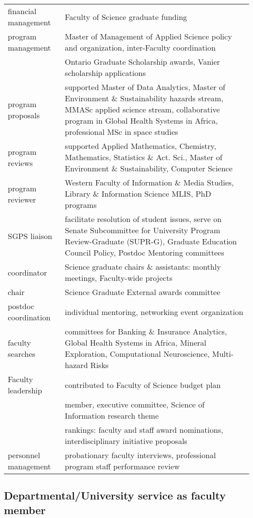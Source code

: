 \begin{tabularx}{\textwidth}{lX}
financial management & Faculty of Science graduate funding  \\
program management & Master of Management of Applied Science policy and organization, inter-Faculty coordination   \\
  & Ontario Graduate Scholarship awards, Vanier scholarship applications \\
program proposals &  supported Master of Data Analytics, Master of Environment \& Sustainability hazards stream, MMASc applied science stream, collaborative program in Global Health Systems in Africa, professional MSc in space studies  \\
program reviews & supported Applied Mathematics, Chemistry, Mathematics, Statistics \& Act. Sci., Master of Environment \& Sustainability, Computer Science  \\
program reviewer & Western Faculty of Information \& Media Studies, Library \& Information Science MLIS, PhD programs  \\
SGPS liaison  &  facilitate resolution of student issues, serve on Senate Subcommittee for University Program Review-Graduate (SUPR-G), Graduate Education Council Policy, Postdoc Mentoring committees  \\
coordinator & Science graduate chairs \& assistants: monthly meetings, Faculty-wide projects \\
chair & Science Graduate External awards committee  \\
postdoc coordination & individual mentoring, networking event organization  \\ 
faculty searches &  committees for  Banking \& Insurance Analytics, Global Health Systems in Africa, Mineral Exploration, Computational Neuroscience, Multi-hazard Risks  \\
Faculty leadership & contributed to Faculty of Science budget plan  \\
& member, executive committee, Science of Information research theme  \\
& rankings: faculty and staff award nominations, interdisciplinary initiative proposals  \\
personnel management & probationary faculty interviews, professional program staff performance review  \\
\end{tabularx}


\subsection{Departmental/University service as faculty member}

